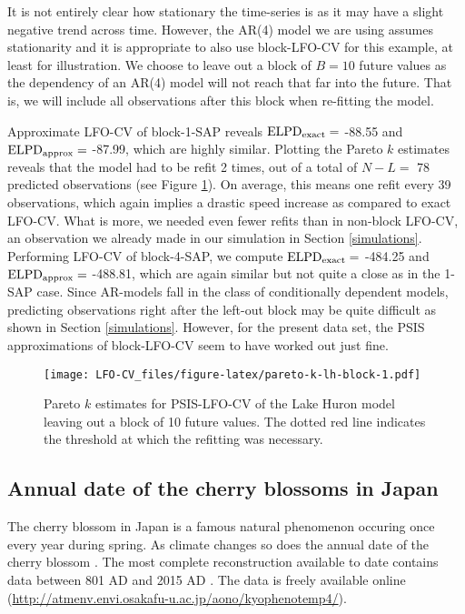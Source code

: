 \documentclass[american,]{article}
\begin{document}
It is not entirely clear how stationary the time-series is as it may have a
slight negative trend across time. However, the AR(4) model we are using assumes
stationarity and it is appropriate to also use block-LFO-CV for this example, at
least for illustration. We choose to leave out a block of \(B = 10\)
future values as the dependency of an AR(4) model will not reach that far into
the future. That is, we will include all observations after this block when
re-fitting the model.

Approximate LFO-CV of block-1-SAP reveals
\({\rm ELPD}_{\rm exact} =\) -88.55 and
\({\rm ELPD}_{\rm approx} =\) -87.99,
which are highly similar. Plotting the Pareto \(k\) estimates reveals that the
model had to be refit 2 times, out of a total of \(N - L =\)
78 predicted observations (see Figure \ref{fig:pareto-k-lh-block}). On average,
this means one refit every 39 observations, which
again implies a drastic speed increase as compared to exact LFO-CV. What is more,
we needed even fewer refits than in non-block LFO-CV, an observation we already
made in our simulation in Section \ref{simulations}.
Performing LFO-CV of block-4-SAP, we compute
\({\rm ELPD}_{\rm exact} =\) -484.25 and
\({\rm ELPD}_{\rm approx} =\) -488.81,
which are again similar but not quite a close as in the 1-SAP case.
Since AR-models fall in the class of conditionally dependent models, predicting
observations right after the left-out block may be quite difficult as shown
in Section \ref{simulations}. However, for the present data set, the
PSIS approximations of block-LFO-CV seem to have worked out just fine.

\begin{figure}
\centering
\texttt{[image: LFO-CV\_files/figure-latex/pareto-k-lh-block-1.pdf]}
\caption{\label{fig:pareto-k-lh-block}Pareto \(k\) estimates for PSIS-LFO-CV of the Lake Huron model leaving out a block of 10 future values. The dotted red line indicates the threshold at which the refitting was necessary.}
\end{figure}

\hypertarget{annual-date-of-the-cherry-blossoms-in-japan}{%
\subsection{Annual date of the cherry blossoms in Japan}\label{annual-date-of-the-cherry-blossoms-in-japan}}

The cherry blossom in Japan is a famous natural phenomenon occuring once every
year during spring. As climate changes so does the annual date of the cherry
blossom \citep{aono2008, aono2010}. The most complete reconstruction available to
date contains data between 801 AD and 2015 AD
\citep{aono2008, aono2010}. The data is freely available online
(\url{http://atmenv.envi.osakafu-u.ac.jp/aono/kyophenotemp4/}).
\end{document}
